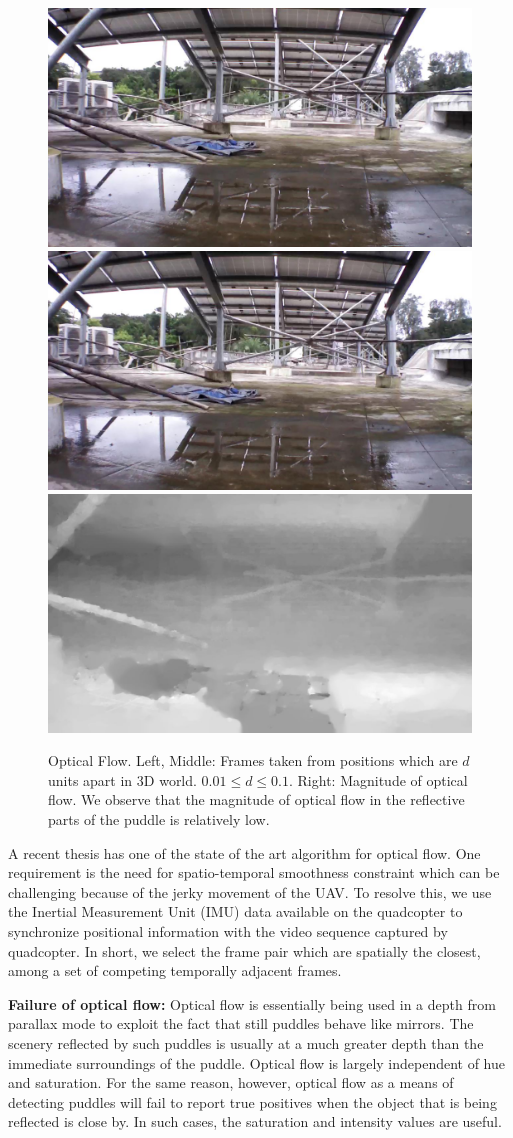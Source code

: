 \begin{figure}[h!]
  \centering
  \includegraphics[width=0.32\linewidth]{figures/stagnantWater/IMG_PAIR_27_1.jpg} \hfill
  \includegraphics[width=0.32\linewidth]{figures/stagnantWater/IMG_PAIR_27_2.jpg} \hfill
  \includegraphics[width=0.32\linewidth]{figures/stagnantWater/IMG_PAIR_27_optical_flow.jpg}
  \caption[Sample Optical Flow]{Optical Flow. Left, Middle: Frames taken from
  positions which are $d$ units apart in 3D world. $ 0.01 \leq d \leq 0.1$. Right:
    Magnitude of optical flow. We observe that the magnitude of optical
    flow in the reflective parts of the puddle is relatively low.}
  \label{fig:optical_flow}
\end{figure}

A recent thesis \cite{Liu11Thesis} has one of the state of the art
algorithm for optical flow. One requirement is the need for
spatio-temporal smoothness constraint which can be challenging because
of the jerky movement of the UAV.  To resolve this, we use the
Inertial Measurement Unit (IMU) data available on the quadcopter to
synchronize positional information with the video sequence captured by
quadcopter. In short, we select the frame pair which are spatially the
closest, among a set of competing temporally adjacent frames.

\textbf{Failure of optical flow:} Optical flow is essentially being
used in a depth from parallax mode to exploit the fact that still
puddles behave like mirrors. The scenery reflected by such puddles is
usually at a much greater depth than the immediate surroundings of the
puddle.  Optical flow is largely independent of hue and saturation.
For the same reason, however, optical flow as a means of detecting
puddles will fail to report true positives when the object that is
being reflected is close by. In such cases, the saturation and
intensity values are useful.

